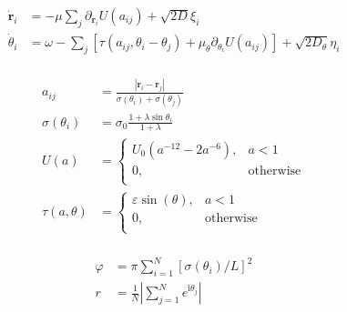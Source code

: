 \documentclass[10pt,aspectratio=43,mathserif,table]{beamer}
\begin{document}
\begin{frame}
    \begin{multicols}{2}
    
        {\scriptsize
        $$
        \begin{aligned}
            \dot{\mathbf{r}}_i&=-\mu \sum_j{\partial _{\mathbf{r}_i}U\left( a_{ij} \right) +\sqrt{2D}\xi _i}\\
            \dot{\theta}_i&=\omega -\sum_j{\left[ \tau \left( a_{ij},\theta _i-\theta _j \right) +\mu _{\theta}\partial _{\theta _i}U\left( a_{ij} \right) \right] +\sqrt{2D_{\theta}}\eta _i}\\
        \end{aligned}
        $$
        }

        {
        \scriptsize
    
        $$
        \begin{aligned}
            a_{ij}&=\frac{\left| \mathbf{r}_i-\mathbf{r}_j \right|}{\sigma \left( \theta _i \right) +\sigma \left( \theta _j \right)}\\
            \sigma \left( \theta _i \right) &=\sigma _0\frac{1+\lambda \sin \theta _i}{1+\lambda}\\
            U\left( a \right) &=\begin{cases}
            U_0\left( a^{-12}-2a^{-6} \right) ,&		a<1\\
            0,&		\mathrm{otherwise}\\
        \end{cases}\\
            \tau \left( a,\theta \right) &=\begin{cases}
            \varepsilon \sin \left( \theta \right) ,&		a<1\\
            0,&		\mathrm{otherwise}\\
        \end{cases}\\
        \end{aligned}
        $$

        $$
        \begin{aligned}
            \varphi &=\pi \sum_{i=1}^N{\left[ \sigma \left( \theta _i \right) /L \right] ^2}\\
            r&=\frac{1}{N}\left| \sum_{j=1}^N{e^{\mathrm{i}\theta _j}} \right|\\
        \end{aligned}
        $$

}
\end{multicols}
\end{frame}
\end{document}
